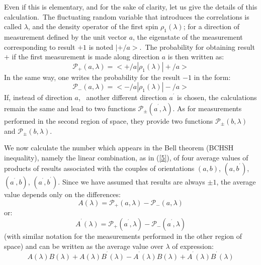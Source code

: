 \documentclass[12pt,onecolumn]{article}%
\begin{document}
Even if this is elementary, and for the sake of clarity, let us give the
details of this calculation.\ The fluctuating random variable that introduces
the correlations is called $\lambda$, and the density operator of the first
spin $\rho_{1}(\lambda)$; for a direction of measurement defined by the unit
vector $a$, the eigenstate of the measurement corresponding to result $+1$ is
noted $|+/a>$.\ The probability for obtaining result $+$ if the first
measurement is made along direction $a$ is then written as:
\begin{equation}
\mathcal{P}_{+}(a,\lambda)=<+/a|\rho_{1}(\lambda)|+/a> \label{aa1}%
\end{equation}
In the same way, one writes the probability for the result $-1$ in the form:
\begin{equation}
\mathcal{P}_{-}(a,\lambda)=<-/a|\rho_{1}(\lambda)|-/a> \label{aa2}%
\end{equation}
If, instead of direction $a$, \ another different direction $a^{^{\prime}}$ is
chosen, the calculations remain the same and lead to two functions
$\mathcal{P}_{\pm}(a^{^{\prime}},\lambda)$. As for measurements performed in
the second region of space, they provide two functions $\mathcal{P}_{\pm
}(b,\lambda)$ and $\mathcal{P}_{\pm}(b,\lambda)$.

We now calculate the number which appears in the Bell theorem (BCHSH
inequality), namely the linear combination, as in (\ref{5}), of four average
values of products of results associated with the couples of orientations
$(a,b)$, $(a,b^{^{\prime}})$, $(a^{^{\prime}},b)$, $(a^{^{\prime}}%
,b^{^{\prime}})$. Since we have assumed that results are always $\pm1$, the
average value depends only on the differences:
\begin{equation}
A(\lambda)=\mathcal{P}_{+}(a,\lambda)-\mathcal{P}_{-}(a,\lambda) \label{aa3}%
\end{equation}
or:
\begin{equation}
A^{^{\prime}}(\lambda)=\mathcal{P}_{+}(a^{^{\prime}},\lambda)-\mathcal{P}%
_{-}(a^{^{\prime}},\lambda) \label{aa4}%
\end{equation}
(with similar notation for the measurements performed in the other region of
space) and can be written as the average value over $\lambda$ of expression:
\begin{equation}
A(\lambda)B(\lambda)+A(\lambda)B^{^{\prime}}(\lambda)-A^{^{\prime}}%
(\lambda)B(\lambda)+A^{^{\prime}}(\lambda)B^{^{\prime}}(\lambda) \label{aa5}%
\end{equation}
\end{document}

